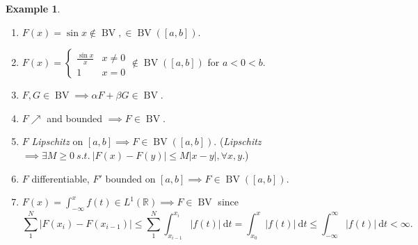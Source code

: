 \documentclass{report}
\newcommand{\R}{\mathbb{R}}
\newcommand{\st}{\ s.t.\ }
\def \BV {\operatorname{BV}}
\newcommand{\df}{\ \mathrm{d}}
\theoremstyle{definition}
\newtheorem{example}[theorem]{Example}
\theoremstyle{remark}
\newcommand{\fnl}{\parbox[t]{0\linewidth}{}}
\begin{document}
\begin{example}\fnl
	\begin{enumerate}
		\item $F(x) = \sin x \notin \BV, \in \BV([a, b])$.
		\item $F(x) = \begin{cases}
			\frac{\sin x}{x} & x \neq 0 \\
			1 & x = 0
		\end{cases} \notin \BV([a, b])$ for $a < 0 < b$.
		\item $F, G \in \BV \implies \alpha F + \beta G \in \BV$.
		\item $F \nearrow$ and bounded $\implies F \in \BV$.
		\item $F$ \emph{Lipschitz} on $[a, b] \implies F \in \BV([a, b])$. (\emph{Lipschitz} $\implies \exists M \geq 0 \st |F(x) - F(y)| \leq M|x - y|, \forall x, y$.)
		\item $F$ differentiable, $F'$ bounded on $[a, b] \implies F \in \BV([a, b])$.
		\item $F(x) = \int_{-\infty}^x f(t) \in L^1(\R) \implies F \in \BV$ since \[
			\sum_{1}^N|F(x_i) - F(x_{i-1})| \leq \sum_1^N \int_{x_{i-1}}^{x_i} |f(t)| \df t = \int_{x_0}^x |f(t)| \df t \leq \int_{-\infty}^\infty |f(t)| \df t < \infty.
		\]
	\end{enumerate}
\end{example}
\end{document}
